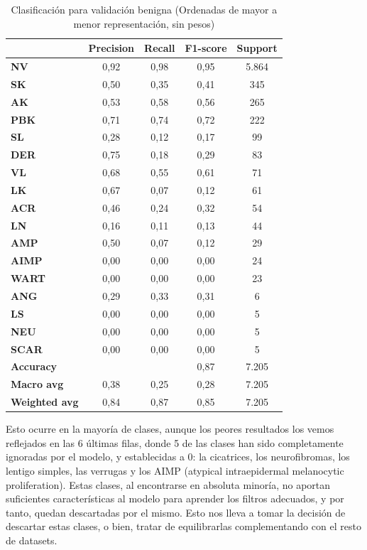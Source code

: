 \begin{table}[!ht]
	\centering
	\begin{tabular}{|l|c|c|c|c|}
		\hline
		& \textbf{Precision} & \textbf{Recall} & \textbf{F1-score} & \textbf{Support} \\
		\hline
		\textbf{NV} & 0,92 & 0,98 & 0,95 & 5.864 \\ 
		\textbf{SK} & 0,50 & 0,35 & 0,41 & 345 \\ 
		\textbf{AK} & 0,53 & 0,58 & 0,56 & 265 \\ 
		\textbf{PBK} & 0,71 & 0,74 & 0,72 & 222 \\ 
		\textbf{SL} & 0,28 & 0,12 & 0,17 & 99 \\ 
		\textbf{DER} & 0,75 & 0,18 & 0,29 & 83 \\ 
		\textbf{VL} & 0,68 & 0,55 & 0,61 & 71 \\ 
		\textbf{LK} & 0,67 & 0,07 & 0,12 & 61 \\ 
		\textbf{ACR} & 0,46 & 0,24 & 0,32 & 54 \\ 
		\textbf{LN} & 0,16 & 0,11 & 0,13 & 44 \\ 
		\textbf{AMP} & 0,50 & 0,07 & 0,12 & 29 \\ 
		\textbf{AIMP} & 0,00 & 0,00 & 0,00 & 24 \\ 
		\textbf{WART} & 0,00 & 0,00 & 0,00 & 23 \\ 
		\textbf{ANG} & 0,29 & 0,33 & 0,31 & 6 \\ 
		\textbf{LS} & 0,00 & 0,00 & 0,00 & 5 \\ 
		\textbf{NEU} & 0,00 & 0,00 & 0,00 & 5 \\ 
		\textbf{SCAR} & 0,00 & 0,00 & 0,00 & 5 \\ \hline
		\textbf{Accuracy} &  &  & 0,87 & 7.205 \\ \hline
		\textbf{Macro avg} & 0,38& 0,25& 0,28&7.205\\
		\textbf{Weighted avg}&0,84&0,87&0,85&7.205\\
		\hline
	\end{tabular}
		\caption{Clasificación para validación benigna (Ordenadas de mayor a menor representación, sin pesos)}
	\label{tab:benignomalmetrics}
\end{table}

Esto ocurre en la mayoría de clases, aunque los peores resultados los vemos reflejados en las 6 últimas filas, donde 5 de las clases han sido completamente ignoradas por el modelo, y establecidas a 0: la cicatrices, los neurofibromas, los lentigo simples, las verrugas y los AIMP (atypical intraepidermal melanocytic proliferation). Estas clases, al encontrarse en absoluta minoría, no aportan suficientes características al modelo para aprender los filtros adecuados, y por tanto, quedan descartadas por el mismo. Esto nos lleva a tomar la decisión de descartar estas clases, o bien, tratar de equilibrarlas complementando con el resto de datasets.

